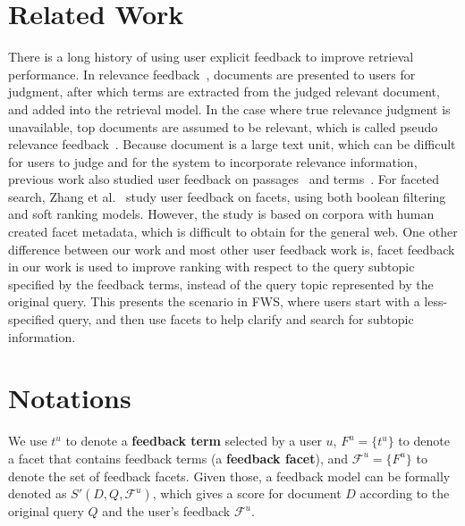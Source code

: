 \section{Related Work}
There is a long history of using user explicit feedback to improve retrieval performance. In relevance feedback~\cite{rocchio71relevance,salton1997improving}, documents are presented to users for judgment, after which terms are extracted from the judged relevant document, and added into the retrieval model. In the case where true relevance judgment is unavailable, top documents are assumed to be relevant, which is called pseudo relevance feedback~\cite{buckley1995automatic,abdul2004umass}. Because document is a large text unit, which can be difficult for users to judge and for the system to incorporate relevance information, previous work also studied user feedback on passages~\cite{allan1995relevance,xu1996query} and terms~\cite{koenemann1996case,tan2007term}. For faceted search, Zhang et al.~\cite{zhang2010interactive} study user feedback on facets, using both boolean filtering and soft ranking models. However, the study is based on corpora with human created facet metadata, which is difficult to 
obtain for the  general web.  One other difference between our work and most other user feedback work is, facet feedback in our work is used to improve ranking with respect to the query subtopic specified by the feedback terms, instead of the query topic represented by the original query. This presents the scenario in FWS, where users start with a less-specified query, and then use facets to help clarify and search for subtopic information.

\section{Notations} \label{sec:fdbk-notations}
We use $t^u$ to denote a \textbf{feedback term} selected by a user $u$, $F^u=\{t^u\}$ to denote a facet that contains feedback terms (a \textbf{feedback facet}), and $\mathcal{F}^u=\{F^u\}$ to denote the set of feedback facets. Given those, a feedback model can be formally denoted as $S'(D,Q,\mathcal{F}^u)$, which gives a score for document $D$ according to the original query $Q$ and the user's feedback $\mathcal{F}^u$. 

